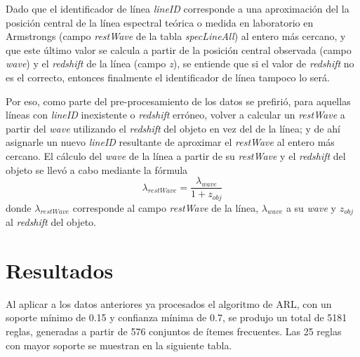 Dado que el identificador de línea \textit{lineID} corresponde a una aproximación del la posición central de la línea espectral teórica o medida en laboratorio en Armstrongs (campo \textit{restWave} de la tabla \textit{specLineAll}) al entero más cercano, y que este último valor se calcula a partir de la posición central observada (campo \textit{wave}) y el \textit{redshift} de la línea (campo \textit{z}), se entiende que si el valor de \textit{redshift} no es el correcto, entonces finalmente el identificador de línea tampoco lo será.

Por eso, como parte del pre-procesamiento de los datos se prefirió, para aquellas líneas con \textit{lineID} inexistente o \textit{redshift} erróneo, volver a calcular un \textit{restWave} a partir del \textit{wave} utilizando el \textit{redshift} del objeto en vez del de la línea; y de ahí asignarle un nuevo \textit{lineID} resultante de aproximar el \textit{restWave} al entero más cercano. El cálculo del \textit{wave} de la línea a partir de su \textit{restWave} y el \textit{redshift} del objeto se llevó a cabo mediante la fórmula $$\lambda_{restWave} = \frac{\lambda_{wave}}{1 + z_{obj}}$$ donde $\lambda_{restWave}$ corresponde al campo \textit{restWave} de la línea, $\lambda_{wave}$ a su \textit{wave} y $z_{obj}$ al \textit{redshift} del objeto.

\section{Resultados}

Al aplicar a los datos anteriores ya procesados el algoritmo de ARL, con un soporte mínimo de 0.15 y confianza mínima de 0.7, se produjo un total de 5181 reglas, generadas a partir de 576 conjuntos de ítemes frecuentes. Las 25 reglas con mayor soporte se muestran en la siguiente tabla.

